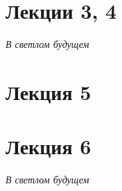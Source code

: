 


    
    \newpage
    \hypertarget{intro}{}
    \tableofcontents
    \newpage
    
    
    
    
    
    \section{Лекции 3, 4}
    \textit{В светлом будущем}
    
    \section{Лекция 5}
    
     
    \section{Лекция 6}
    \textit{В светлом будущем}
        
    
    \newpage
    
